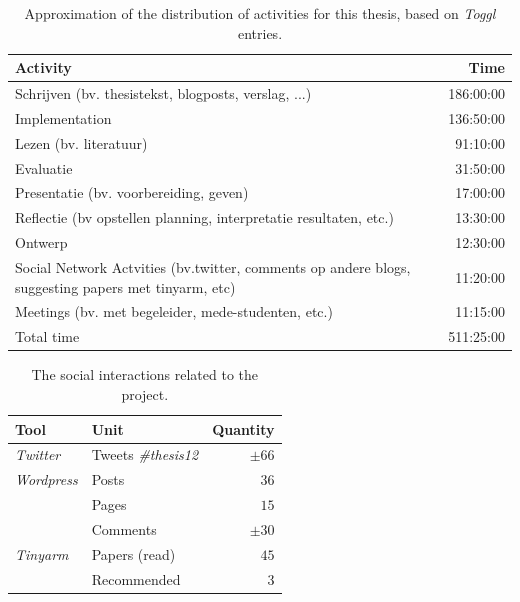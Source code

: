 \begin{table}%

	\caption{Approximation of the distribution of activities for this thesis, based on \emph{Toggl} entries.}
	
	\begin{center}
		\begin{tabular}{ p{350px} | r }
			\hline
			\textbf{Activity} & \textbf{Time} \\
			\hline
			Schrijven (bv. thesistekst, blogposts, verslag, ...) 																								& 186:00:00 \\
			Implementation 																																											& 136:50:00 \\
			Lezen (bv. literatuur) 																																							& 91:10:00 \\
			Evaluatie 																																													& 31:50:00 \\
			Presentatie (bv. voorbereiding, geven) 																															& 17:00:00 \\
			Reflectie (bv opstellen planning, interpretatie resultaten, etc.) 																	& 13:30:00 \\
			Ontwerp 																																														& 12:30:00 \\
			Social Network Actvities (bv.twitter, comments op andere blogs, suggesting papers met tinyarm, etc) & 11:20:00 \\
			Meetings (bv. met begeleider, mede-studenten, etc.) 																								& 11:15:00 \\
			\hline
			\hline
			Total time 																																													& 511:25:00 \\
			\hline
		\end{tabular}
	\end{center}
	\label{table:toggl:stats}
\end{table}


\begin{table}%

	\caption{The social interactions related to the project.}
	
	\begin{center}
		\begin{tabular}{ l | l | r }
			\hline
			\textbf{Tool} 		& \textbf{Unit} 						& \textbf{Quantity} \\
			\hline
			\emph{Twitter} 		& Tweets \emph{\#thesis12}	& $\pm66$		\\
			\emph{Wordpress}	& Posts 										& $36$		\\
												& Pages 										& $15$		\\
												& Comments 									& $\pm30$	\\
			\emph{Tinyarm}		& Papers (read)							&	$45$		\\
												& Recommended								&	$3$			\\
			\hline
		\end{tabular}
	\end{center}
	\label{table:socialmedia:stats}
\end{table}


